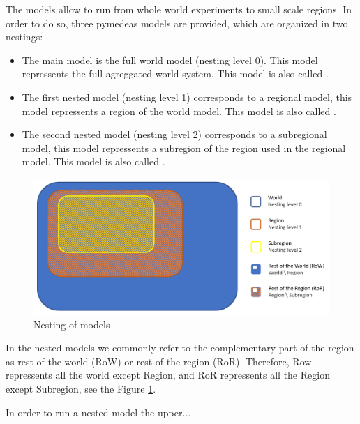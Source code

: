The \model models allow to run from whole world experiments to small scale regions. In order to do so, three pymedeas models are provided, which are organized in two nestings:
\begin{itemize}
    \item The main model is the full world model (nesting level 0). This model repressents the full agreggated world system. This model is also called .
    \item The first nested model (nesting level 1) corresponds to a regional model, this model repressents a region of the world model. This model is also called .
    \item The second nested model (nesting level 2) corresponds to a subregional model, this model repressents a subregion of the region used in the regional model.  This model is also called .
\end{itemize}

\begin{figure}[H]
    \includegraphics[width=\textwidth]{figures/nesting.png}
    \caption{Nesting of \model models}
    \label{fig:nesting}
\end{figure}

In the nested models we commonly refer to the complementary part of the region as rest of the world (RoW) or rest of the region (RoR). Therefore, Row repressents all the world except Region, and RoR repressents all the Region except Subregion, see the Figure \ref{fig:nesting}.

In order to run a nested model the upper... 

